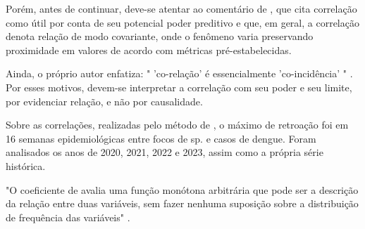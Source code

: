 \indent Porém, antes de continuar, deve-se atentar ao comentário de , que cita correlação como útil por conta de seu potencial poder preditivo e que, em geral, a correlação denota relação de modo covariante, onde o fenômeno varia preservando proximidade em valores de acordo com métricas pré-estabelecidas.

\indent Ainda, o próprio autor enfatiza: " 'co-relação' é essencialmente 'co-incidência' " \cite{espurioCorr}. Por esses motivos, devem-se interpretar a correlação com seu poder e seu limite, por evidenciar relação, e não por causalidade.

\indent Sobre as correlações, realizadas pelo método de , o máximo de retroação foi em 16 semanas epidemiológicas entre focos de  sp. e casos de dengue. Foram analisados os anos de 2020, 2021, 2022 e 2023, assim como a própria série histórica.

\indent "O coeficiente de  avalia uma função monótona arbitrária que pode ser a descrição da relação entre duas variáveis, sem fazer nenhuma suposição sobre a distribuição de frequência das variáveis" \cite{AedesTemp}.


